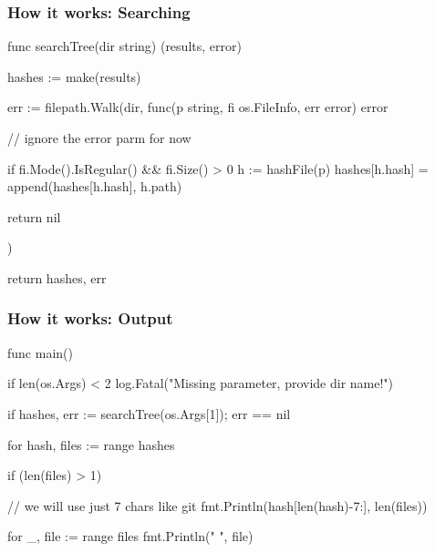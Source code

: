 \documentclass[compress,t,11pt]{beamer}
\begin{document}
\begin{frame}[fragile]
    \frametitle{How it works: Searching}
\begin{golang}
func searchTree(dir string) (results, error) {
	hashes := make(results)

	err := filepath.Walk(dir, func(p string, fi os.FileInfo,
                                   err error) error {
        // ignore the error parm for now

		if fi.Mode().IsRegular() && fi.Size() > 0 {
			h := hashFile(p)
			hashes[h.hash] = append(hashes[h.hash], h.path)
		}

		return nil
	})

	return hashes, err
}
\end{golang}
\end{frame}

\begin{frame}[fragile]
    \frametitle{How it works: Output}
\begin{golang}
func main() {
    if len(os.Args) < 2 {
        log.Fatal("Missing parameter, provide dir name!")
    }

    if hashes, err := searchTree(os.Args[1]); err == nil {
    	for hash, files := range hashes {
    		if (len(files) > 1) {
                // we will use just 7 chars like git
    			fmt.Println(hash[len(hash)-7:], len(files))

    			for _, file := range files {
    				fmt.Println("   ", file)
    			}
    		}
    	}
    }
}
\end{golang}
\end{frame}
\end{document}
